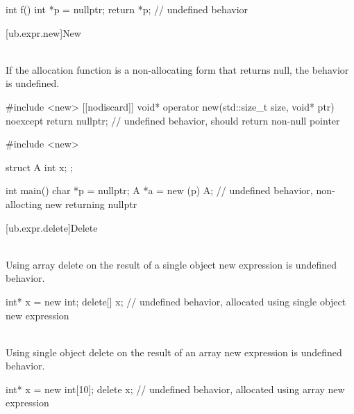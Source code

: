 \pnum
\begin{example}
\begin{codeblock}
int f()
{
  int *p = nullptr;
  return *p;    // undefined behavior
}
\end{codeblock}
\end{example}


[ub.expr.new]{New}

\pnum
{} \\
If the allocation
function is a non-allocating form  that returns null, the behavior is undefined.

\pnum
\begin{example}
\begin{codeblock}
#include <new>
[[nodiscard]] void* operator new(std::size_t size, void* ptr) noexcept {
  return nullptr;       // undefined behavior,  should return non-null pointer
}
\end{codeblock}
\end{example}
\begin{example}
\begin{codeblock}
#include <new>

struct A {
  int x;
};

int main() {
  char *p = nullptr;
  A *a = new (p) A;     // undefined behavior, non-allocting new returning nullptr
}
\end{codeblock}
\end{example}


[ub.expr.delete]{Delete}

\pnum
{} \\
Using array delete on the result of a single object new expression is undefined behavior.

\pnum
\begin{example}
\begin{codeblock}
int* x = new int;
delete[] x;         // undefined behavior, allocated using single object new expression
\end{codeblock}
\end{example}

\pnum
{} \\
Using single object delete on the result of an array new expression is undefined behavior.

\pnum
\begin{example}
\begin{codeblock}
int* x = new int[10];
delete x;           // undefined behavior, allocated using array new expression
\end{codeblock}
\end{example}


